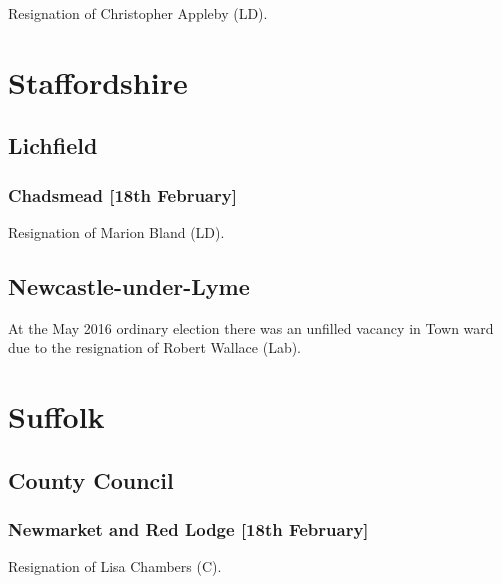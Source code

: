 \documentclass[a4paper,openany]{book}
\begin{document}
\begin{resultsiii}
Resignation of Christopher Appleby (LD).

\section{Staffordshire}

\subsection*{Lichfield}

\subsubsection*{Chadsmead \hspace*{\fill}\nolinebreak[1]%
\enspace\hspace*{\fill}
[18th February]}


Resignation of Marion Bland (LD).

\subsection*{Newcastle-under-Lyme}

At the May 2016 ordinary election there was an unfilled vacancy in Town ward due to the resignation of Robert Wallace (Lab).

\section{Suffolk}

\subsection*{County Council}

\subsubsection*{Newmarket and Red Lodge \hspace*{\fill}\nolinebreak[1]%
\enspace\hspace*{\fill}
[18th February]}


Resignation of Lisa Chambers (C).


\end{resultsiii}
\end{document}
